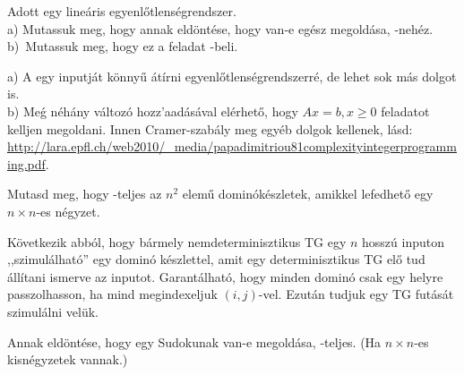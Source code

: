 \begin{Exercise}[counter={sorszam}, difficulty=0]
	Adott egy line\'aris egyenl\H otlens\'egrendszer.\\
	a) Mutassuk meg, hogy annak eldöntése, hogy van-e eg\'esz megold\'asa, \NP-neh\'ez.\\
	b)~\hard Mutassuk meg, hogy ez a feladat \NP-beli.
\end{Exercise}	
\begin{Answer}
	a) A \SAT egy inputj\'at k\"onny\H u \'at\'irni egyenl\H otlens\'egrendszerr\'e, de lehet sok m\'as dolgot is.\\
	b) Me\'g n\'eh\'any v\'altoz\'o hozz'aad\'as\'aval el\'erhet\H o, hogy $Ax=b, x\ge 0$ feladatot kelljen megoldani.
	Innen Cramer-szab\'aly meg egy\'eb dolgok kellenek, l\'asd: \url{http://lara.epfl.ch/web2010/_media/papadimitriou81complexityintegerprogramming.pdf}.
\end{Answer}

\begin{Exercise}[counter={sorszam}, difficulty=1]
	Mutasd meg, hogy \NP-teljes az $n^2$ elem\H u domin\'ok\'eszletek, amikkel lefedhet\H o egy $n\times n$-es n\'egyzet.
\end{Exercise}	
\begin{Answer}
	K\"ovetkezik abb\'ol, hogy b\'armely nemdeterminisztikus TG egy $n$ hossz\'u inputon ,,szimul\'alhat\'o'' egy domin\'o k\'eszlettel, amit egy determinisztikus TG el\H o tud \'all\'itani ismerve az inputot.
	Garant\'alhat\'o, hogy minden domin\'o csak egy helyre passzolhasson, ha mind megindexeljuk $(i,j)$-vel.
	Ezut\'an tudjuk egy TG fut\'as\'at szimul\'alni vel\"uk.
\end{Answer}

\begin{Exercise}[counter={sorszam}, difficulty=1]
	Annak eldöntése, hogy egy Sudokunak van-e megold\'asa, \NP-teljes. (Ha $n\times n$-es kisn\'egyzetek vannak.)
\end{Exercise}	



